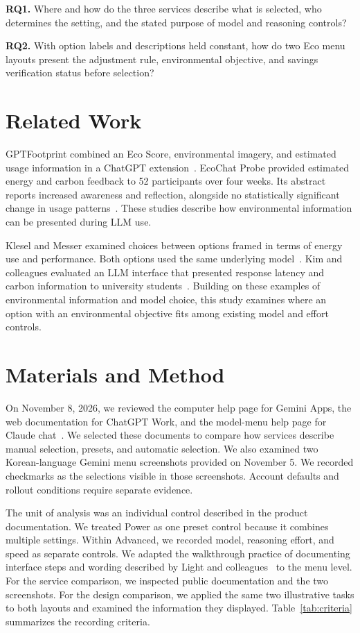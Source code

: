 \documentclass[11pt,letterpaper]{article}
\begin{document}
\textbf{RQ1.} Where and how do the three services describe what is
selected, who determines the setting, and the stated purpose of model
and reasoning controls?

\textbf{RQ2.} With option labels and descriptions held constant, how do
two Eco menu layouts present the adjustment rule, environmental
objective, and savings verification status before selection?

\section{Related Work}

GPTFootprint combined an Eco Score, environmental imagery, and
estimated usage information in a ChatGPT extension~\cite{graves2025}.
EcoChat Probe provided estimated energy and carbon feedback to 52
participants over four weeks. Its abstract reports increased awareness
and reflection, alongside no statistically significant change in usage
patterns~\cite{ren2026}. These studies describe how environmental
information can be presented during LLM use.

Klesel and Messer examined choices between options framed in terms of
energy use and performance. Both options used the same underlying
model~\cite{klesel2026}. Kim and colleagues evaluated an LLM interface
that presented response latency and carbon information to university
students~\cite{kim2026}. Building on these examples of environmental
information and model choice, this study examines where an option with
an environmental objective fits among existing model and effort
controls.

\section{Materials and Method}

On November 8, 2026, we reviewed the computer help page for Gemini
Apps, the web documentation for ChatGPT Work, and the model-menu help
page for Claude chat~\cite{google2026,openai2026,anthropic2026}. We
selected these documents to compare how services describe manual
selection, presets, and automatic selection. We also examined two
Korean-language Gemini menu screenshots provided on November 5. We
recorded checkmarks as the selections visible in those screenshots.
Account defaults and rollout conditions require separate evidence.

The unit of analysis was an individual control described in the product
documentation. We treated Power as one preset control because it
combines multiple settings. Within Advanced, we recorded model,
reasoning effort, and speed as separate controls. We adapted the
walkthrough practice of documenting interface steps and wording
described by Light and colleagues~\cite{light2018} to the menu level.
For the service comparison, we inspected public documentation and the
two screenshots. For the design comparison, we applied the same two
illustrative tasks to both layouts and examined the information they
displayed. Table~\ref{tab:criteria} summarizes the recording criteria.
\end{document}
